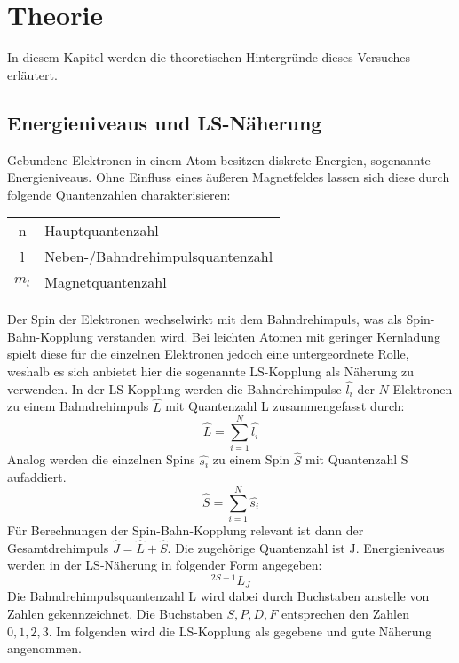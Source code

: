 \section{Theorie} 
\label{sec:Theorie}

In diesem Kapitel werden die theoretischen Hintergründe dieses Versuches erläutert.



\subsection{Energieniveaus und LS-Näherung}
\label{sec:energieniveaus}

Gebundene Elektronen in einem Atom besitzen diskrete Energien, sogenannte Energieniveaus.
Ohne Einfluss eines äußeren Magnetfeldes lassen sich diese durch folgende Quantenzahlen charakterisieren:

\begin{flushleft}
\begin{table}
\begin{tabular}{c l}
n&Hauptquantenzahl\\
l&Neben-/Bahndrehimpulsquantenzahl\\
$m_l$&Magnetquantenzahl\\
\end{tabular}
\end{table}
\end{flushleft}

Der Spin der Elektronen wechselwirkt mit dem Bahndrehimpuls, was als Spin-Bahn-Kopplung verstanden wird.
Bei leichten Atomen mit geringer Kernladung spielt diese für die einzelnen Elektronen jedoch eine untergeordnete Rolle, weshalb es sich anbietet hier die sogenannte LS-Kopplung als Näherung zu verwenden.
In der LS-Kopplung werden die Bahndrehimpulse $\hat{l_i}$ der $N$ Elektronen zu einem Bahndrehimpuls $\hat{L}$ mit Quantenzahl L zusammengefasst durch:
\begin{equation}
\hat{L} = \sum_{i=1}^{N} \hat{l_i}
\end{equation}
Analog werden die einzelnen Spins $\hat{s_i}$ zu einem Spin $\hat{S}$ mit Quantenzahl S aufaddiert.
\begin{equation}
\hat{S} = \sum_{i=1}^{N} \hat{s_i}
\end{equation}
Für Berechnungen der Spin-Bahn-Kopplung relevant ist dann der Gesamtdrehimpuls $\hat{J} = \hat{L}+ \hat{S}$. Die zugehörige Quantenzahl ist J.
Energieniveaus werden in der LS-Näherung in folgender Form angegeben:
\begin{equation}
^{2S+1}L_J
\end{equation}
Die Bahndrehimpulsquantenzahl L wird dabei durch Buchstaben anstelle von Zahlen gekennzeichnet. Die Buchstaben $S, P, D, F$ entsprechen den Zahlen $0, 1, 2, 3$.
Im folgenden wird die LS-Kopplung als gegebene und gute Näherung angenommen.




